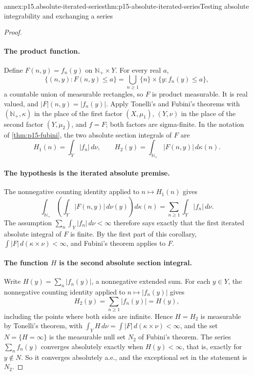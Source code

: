 \begin{annexitem}{annex:p15.absolute-iterated-series}{thm:p15-absolute-iterated-series}{Testing absolute integrability and exchanging a series}
\begin{proof}
\paragraph{The product function.}
Define \(F(n,y)=f_n(y)\) on \(\mathbb N_+\times Y\). For every real \(a\),
\[
 \{(n,y):F(n,y)\leq a\}
       =\bigcup_{n\geq1}\{n\}\times\{y:f_n(y)\leq a\},
\]
a countable union of measurable rectangles, so \(F\) is product
measurable. It is real valued, and \(|F|(n,y)=|f_n(y)|\). Apply
Tonelli's and Fubini's theorems with \((\mathbb N_+,\kappa)\) in the
place of the first factor \((X,\mu_1)\), \((Y,\nu)\) in the place of
the second factor \((Y,\mu_2)\), and \(f=F\); both factors are
sigma-finite. In the notation of \cref{thm:p15-fubini}, the two absolute
section integrals of \(F\) are
\[
 H_1(n)=\int_Y|f_n|\,d\nu,\qquad
 H_2(y)=\int_{\mathbb N_+}|F(n,y)|\,d\kappa(n).
\]

\paragraph{The hypothesis is the iterated absolute premise.}
The nonnegative counting identity applied to \(n\mapsto H_1(n)\) gives
\[
 \int_{\mathbb N_+}\left(\int_Y|F(n,y)|\,d\nu(y)\right)d\kappa(n)
   =\sum_{n\geq1}\int_Y|f_n|\,d\nu .
\]
The assumption \(\sum_n\int_Y|f_n|\,d\nu<\infty\) therefore says
exactly that the first iterated absolute integral of \(F\) is finite.
By the first part of this corollary,
\(\int|F|\,d(\kappa\times\nu)<\infty\), and Fubini's theorem applies
to \(F\).

\paragraph{The function \(H\) is the second absolute section integral.}
Write \(H(y)=\sum_n|f_n(y)|\), a nonnegative extended sum.
For each \(y\in Y\), the nonnegative counting identity applied to
\(n\mapsto|f_n(y)|\) gives
\[
 H_2(y)=\sum_{n\geq1}|f_n(y)|=H(y),
\]
including the points where both sides are infinite. Hence
\(H=H_2\) is measurable by Tonelli's theorem, with
\(\int_YH\,d\nu=\int|F|\,d(\kappa\times\nu)<\infty\), and the set
\(N=\{H=\infty\}\) is the measurable null set \(N_2\) of Fubini's
theorem. The series \(\sum_nf_n(y)\) converges absolutely exactly when
\(H(y)<\infty\), that is, exactly for \(y\notin N\). So it converges
absolutely a.e., and the exceptional set in the statement is \(N_2\).


\end{proof}
\end{annexitem}
